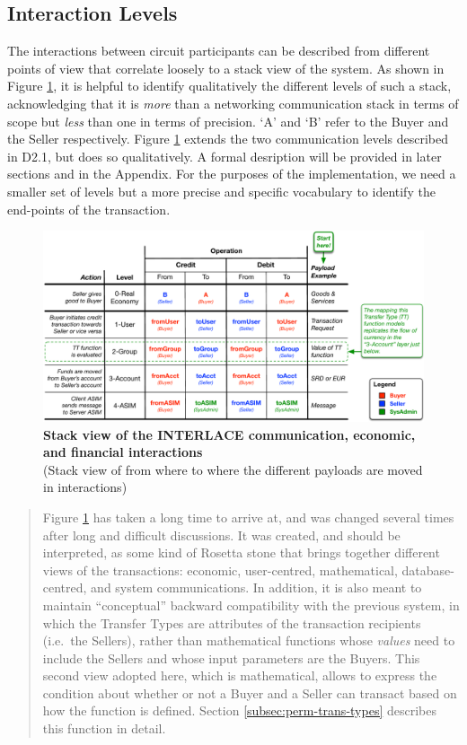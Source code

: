\subsection{Interaction Levels}
\label{sec:intlevels}
The interactions between circuit participants can be described from different points of view that correlate loosely to a stack view of the system. As shown in Figure \ref{fig:stack}, it is helpful to identify qualitatively the different levels of such a stack, acknowledging that it is \emph{more} than a networking communication stack in terms of scope but \emph{less} than one in terms of precision. `A' and `B' refer to the Buyer and the Seller respectively. Figure \ref{fig:stack} extends the two communication levels described in D2.1, but does so qualitatively. A formal desription will be provided in later sections and in the Appendix. For the purposes of the implementation, we need a smaller set of levels but a more precise and specific vocabulary to identify the end-points of the transaction.
\begin{figure}[H]
\centering
\includegraphics[width=17.5cm]{Figures/Stack}
\caption{\small\textbf{Stack view of the INTERLACE communication, economic, and financial interactions}\\
(Stack view of from where to where the different payloads are moved in interactions)}
\label{fig:stack}
\vspace{-0.3cm}
\end{figure}

\begin{quote}
\small
Figure \ref{fig:stack} has taken a long time to arrive at, and was changed several times after long and difficult discussions. It was created, and should be interpreted, as some kind of Rosetta stone that brings together different views of the transactions: economic, user-centred, mathematical, database-centred, and system communications. In addition, it is also meant to maintain ``conceptual'' backward compatibility with the previous system, in which the Transfer Types are attributes of the transaction recipients (i.e.\ the Sellers), rather than mathematical functions whose \emph{values} need to include the Sellers and whose input parameters are the Buyers. This second view adopted here, which is mathematical, allows to express the condition about whether or not a Buyer and a Seller can transact based on how the function is defined. Section \ref{subsec:perm-trans-types} describes this function in detail.
\vspace{-0.5cm}
\end{quote}

